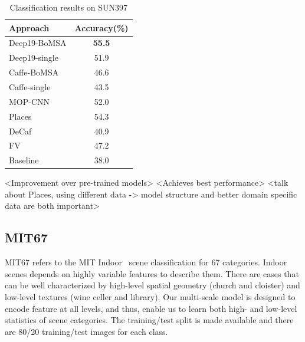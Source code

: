 \documentclass[10pt,twocolumn,letterpaper]{article}
\begin{document}
\begin{table}
\begin{center}
\begin{tabular}{|l|c|}
\hline
Approach & Accuracy(\%) \\
\hline
Deep19-BoMSA & \textbf{55.5} \\
Deep19-single & 51.9 \\
Caffe-BoMSA & 46.6	\\
Caffe-single & 43.5 \\ \hline
MOP-CNN~\cite{Gong14} & 52.0 \\
Places~\cite{Places}	& 54.3	\\
DeCaf~\cite{DeCaf} & 40.9	\\
FV~\cite{FV} & 47.2 \\
Baseline~\cite{SUN397} & 38.0 \\
\hline
\end{tabular}
\end{center}
\caption{Classification results on SUN397}
\label{table:SUN397}
\end{table}

<Improvement over pre-trained models>
<Achieves best performance>
<talk about Places, using different data -> model structure and better domain specific data are both important>


\subsection{MIT67}

MIT67 refers to the MIT Indoor~\cite{MIT67} scene classification for 67 categories. Indoor scenes depends on highly variable features to describe them. There are cases that can be well characterized by high-level spatial geometry (\eg church and cloister) and low-level textures (\eg wine celler and library). Our multi-scale model is designed to encode feature at all levels, and thus, enable us to learn both high- and low-level statistics of scene categories. The training/test split is made available and there are 80/20 training/test images for each class.
\end{document}
